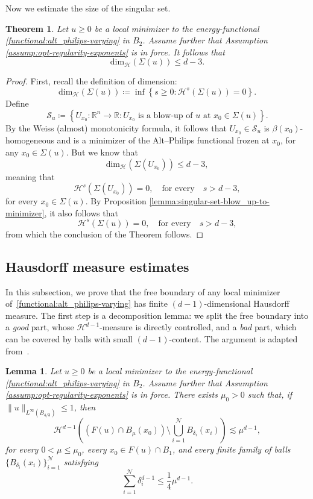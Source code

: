 \documentclass[reqno,11pt]{amsart}
\newtheorem{theorem}{Theorem}[section]
\newtheorem{lemma}{Lemma}[section]
\newcommand{\1}{\mathds{1}}  %
\numberwithin{equation}{section}
\begin{document}
Now we estimate the size of the singular set.

\begin{theorem}\label{thm:dimension-singular-set}
Let $u \geq 0$ be a local minimizer to the energy-functional \eqref{functional:alt_philips-varying} in $B_2$. Assume further that Assumption \eqref{assump:opt-regularity-exponents} is in force. It follows that
\[
	\mathrm{dim}_\mathcal{H}\left(\Sigma(u)\right) \le d-3.
\]
\end{theorem}

\begin{proof}
First, recall the definition of dimension:
\[
    \mathrm{dim}_\mathcal{H}\left(\Sigma(u)\right) \coloneqq \inf \left\{s \geq 0 \colon \mathcal{H}^s(\Sigma(u)) = 0\right\}.
\]
Define 
\[
	\mathcal{S}_u \coloneqq \left\{U_{x_0}\colon \mathbb{R}^n \to \mathbb{R} \colon U_{x_0} \text{ is a blow-up of } u \text{ at } x_0 \in \Sigma(u)\right\}.
\]
By the Weiss (almost) monotonicity formula, it follows that $U_{x_0} \in \mathcal{S}_u$ is $\beta(x_0)$-homogeneous and is a minimizer of the Alt--Philips functional frozen at $x_0$, for any $x_0 \in \Sigma(u)$. But we know that
\[
   \mathrm{dim}_\mathcal{H}\left(\Sigma(U_{x_0})\right) \le d-3, 
\]
meaning that 
\[
    \mathcal{H}^s\left(\Sigma(U_{x_0})\right) = 0, \quad \text{for every} \quad s > d-3, 
\]
for every $x_0 \in \Sigma(u)$. By Proposition \ref{lemma:singular-set-blow_up-to-minimizer}, it also follows that
\[
    \mathcal{H}^s\left(\Sigma(u)\right) = 0, \quad \text{for every} \quad s > d-3,
\]
from which the conclusion of the Theorem follows.
\end{proof}

\subsection{Hausdorff measure estimates}

In this subsection, we prove that the free boundary of any local minimizer of~\eqref{functional:alt_philips-varying} has finite \((d-1)\)-dimensional Hausdorff measure. The first step is a decomposition lemma: we split the free boundary into a \emph{good} part, whose \(\mathcal H^{d-1}\)-measure is directly controlled, and a \emph{bad} part, which can be covered by balls with small \((d-1)\)-content. The argument is adapted from~\cite{DSS0}.

\begin{lemma}\label{lemma : take a ball}
Let $u \geq 0$ be a local minimizer to the energy-functional \eqref{functional:alt_philips-varying} in $B_2$. Assume further that Assumption \eqref{assump:opt-regularity-exponents} is in force. There exists $\mu_0 > 0$ such that, if $\|u\|_{L^\infty(B_{4/3})} \leq 1$, then
\[
    \mathcal{H}^{d-1}\left( \left(F(u) \cap B_{\mu}(x_0)\right) \setminus \bigcup_{i=1}^{\mathcal{N}} B_{\delta_i}(x_i) \right) \lesssim \mu^{d-1},
\]
for every $0 < \mu \leq \mu_0$, every $x_0 \in F(u) \cap B_1$, and every finite family of balls $\{B_{\delta_i}(x_i)\}_{i=1}^{\mathcal{N}}$ satisfying
\[
    \sum_{i=1}^{\mathcal{N}} \delta_i^{d-1} \leq \frac{1}{4}\mu^{d-1}.
\]
\end{lemma}
\end{document}
